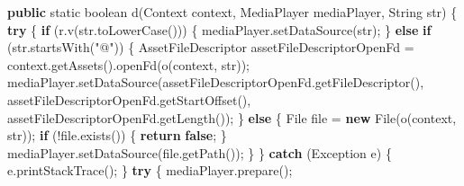 \documentclass[
]{article}
\newenvironment{Shaded}{}{}
\newcommand{\BuiltInTok}[1]{\textcolor[rgb]{0.00,0.50,0.00}{#1}}
\newcommand{\ControlFlowTok}[1]{\textcolor[rgb]{0.00,0.44,0.13}{\textbf{#1}}}
\newcommand{\DataTypeTok}[1]{\textcolor[rgb]{0.56,0.13,0.00}{#1}}
\newcommand{\FunctionTok}[1]{\textcolor[rgb]{0.02,0.16,0.49}{#1}}
\newcommand{\KeywordTok}[1]{\textcolor[rgb]{0.00,0.44,0.13}{\textbf{#1}}}
\newcommand{\NormalTok}[1]{#1}
\newcommand{\OperatorTok}[1]{\textcolor[rgb]{0.40,0.40,0.40}{#1}}
\newcommand{\StringTok}[1]{\textcolor[rgb]{0.25,0.44,0.63}{#1}}
\begin{document}
\begin{Shaded}
\begin{Highlighting}[]
    \KeywordTok{public} \DataTypeTok{static} \DataTypeTok{boolean} \FunctionTok{d}\OperatorTok{(}\BuiltInTok{Context}\NormalTok{ context}\OperatorTok{,}\NormalTok{ MediaPlayer mediaPlayer}\OperatorTok{,} \BuiltInTok{String}\NormalTok{ str}\OperatorTok{)} \OperatorTok{\{}
        \ControlFlowTok{try} \OperatorTok{\{}
            \ControlFlowTok{if} \OperatorTok{(}\NormalTok{r}\OperatorTok{.}\FunctionTok{v}\OperatorTok{(}\NormalTok{str}\OperatorTok{.}\FunctionTok{toLowerCase}\OperatorTok{()))} \OperatorTok{\{}
\NormalTok{                mediaPlayer}\OperatorTok{.}\FunctionTok{setDataSource}\OperatorTok{(}\NormalTok{str}\OperatorTok{);}
            \OperatorTok{\}} \ControlFlowTok{else} \ControlFlowTok{if} \OperatorTok{(}\NormalTok{str}\OperatorTok{.}\FunctionTok{startsWith}\OperatorTok{(}\StringTok{"@"}\OperatorTok{))} \OperatorTok{\{}
\NormalTok{                AssetFileDescriptor assetFileDescriptorOpenFd }\OperatorTok{=}\NormalTok{ context}\OperatorTok{.}\FunctionTok{getAssets}\OperatorTok{().}\FunctionTok{openFd}\OperatorTok{(}\FunctionTok{o}\OperatorTok{(}\NormalTok{context}\OperatorTok{,}\NormalTok{ str}\OperatorTok{));}
\NormalTok{                mediaPlayer}\OperatorTok{.}\FunctionTok{setDataSource}\OperatorTok{(}\NormalTok{assetFileDescriptorOpenFd}\OperatorTok{.}\FunctionTok{getFileDescriptor}\OperatorTok{(),}\NormalTok{ assetFileDescriptorOpenFd}\OperatorTok{.}\FunctionTok{getStartOffset}\OperatorTok{(),}\NormalTok{ assetFileDescriptorOpenFd}\OperatorTok{.}\FunctionTok{getLength}\OperatorTok{());}
            \OperatorTok{\}} \ControlFlowTok{else} \OperatorTok{\{}
                \BuiltInTok{File}\NormalTok{ file }\OperatorTok{=} \KeywordTok{new} \BuiltInTok{File}\OperatorTok{(}\FunctionTok{o}\OperatorTok{(}\NormalTok{context}\OperatorTok{,}\NormalTok{ str}\OperatorTok{));}
                \ControlFlowTok{if} \OperatorTok{(!}\NormalTok{file}\OperatorTok{.}\FunctionTok{exists}\OperatorTok{())} \OperatorTok{\{}
                    \ControlFlowTok{return} \KeywordTok{false}\OperatorTok{;}
                \OperatorTok{\}}
\NormalTok{                mediaPlayer}\OperatorTok{.}\FunctionTok{setDataSource}\OperatorTok{(}\NormalTok{file}\OperatorTok{.}\FunctionTok{getPath}\OperatorTok{());}
            \OperatorTok{\}}
        \OperatorTok{\}} \ControlFlowTok{catch} \OperatorTok{(}\BuiltInTok{Exception}\NormalTok{ e}\OperatorTok{)} \OperatorTok{\{}
\NormalTok{            e}\OperatorTok{.}\FunctionTok{printStackTrace}\OperatorTok{();}
        \OperatorTok{\}}
        \ControlFlowTok{try} \OperatorTok{\{}
\NormalTok{            mediaPlayer}\OperatorTok{.}\FunctionTok{prepare}\OperatorTok{();}

\end{Highlighting}
\end{Shaded}
\end{document}
